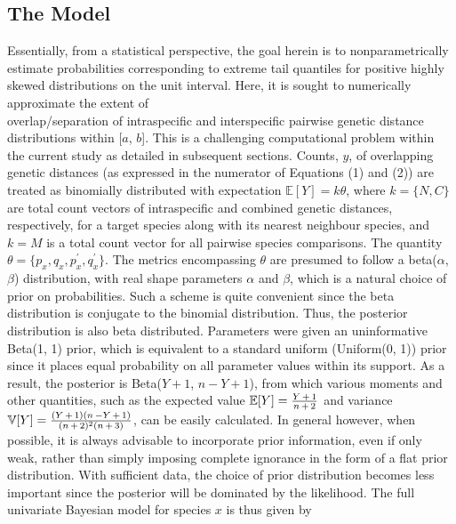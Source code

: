 \documentclass[12pt]{article}
\begin{document}
\subsection{The Model}

Essentially, from a statistical perspective, the goal herein is to nonparametrically estimate probabilities corresponding to extreme tail quantiles for positive highly skewed distributions on the unit interval. Here, it is sought to numerically approximate the extent of \\ overlap/separation of intraspecific and interspecific pairwise genetic distance distributions within [$a$, $b$]. This is a challenging computational problem within the current study as detailed in subsequent sections. Counts, $y$, of overlapping genetic distances (as expressed in the numerator of Equations (1) and (2)) are treated as binomially distributed with expectation $\mathbb{E}[Y] = k\theta$, where $k = \{N, C\}$ are total count vectors of intraspecific and combined genetic distances, respectively, for a target species along with its nearest neighbour species, and $k = M$ is a total count vector for all pairwise species comparisons. The quantity \\ $\theta = \{p_x, q_x, p^{'}_x, q^{'}_x\}$. The metrics encompassing $\theta$ are presumed to follow a beta($\alpha$, $\beta$) distribution, with real shape parameters $\alpha$ and $\beta$, which is a natural choice of prior on probabilities. Such a scheme is quite convenient since the beta distribution is conjugate to the binomial distribution. Thus, the posterior distribution is also beta distributed. Parameters were given an uninformative Beta(1, 1) prior, which is equivalent to a standard uniform (Uniform(0, 1)) prior since it places equal probability on all parameter values within its support. As a result, the posterior is Beta($Y + 1$, $n - Y + 1$), from which various moments and other quantities, such as the expected value $\mathbb{E}[Y] = \frac{Y \hspace{0.5mm} + \hspace{0.5mm} 1}{n \hspace{0.5mm} + \hspace{0.5mm} 2}$ and variance $\mathbb{V}[Y] = \frac{(Y \hspace{0.5mm} + \hspace{0.5mm} 1)(n \hspace{0.5mm} - Y \hspace{0.5mm} + \hspace{0.5mm} 1)}{(n \hspace{0.5mm} + \hspace{0.5mm} 2)^2(n \hspace{0.5mm} + \hspace{0.5mm} 3)}$, can be easily calculated. In general however, when possible, it is always advisable to incorporate prior information, even if only weak, rather than simply imposing complete ignorance in the form of a flat prior distribution. With sufficient data, the choice of prior distribution becomes less important since the posterior will be dominated by the likelihood.  The full univariate Bayesian model for species $x$ is thus given by
\end{document}

